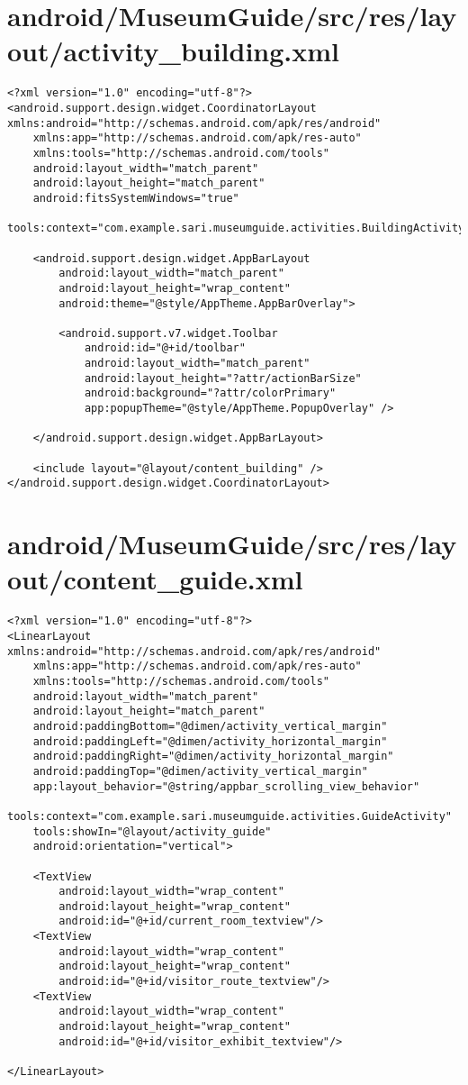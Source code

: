 \section{android/MuseumGuide/src/res/layout/activity\_building.xml}
\begin{lstlisting}<?xml version="1.0" encoding="utf-8"?>
<android.support.design.widget.CoordinatorLayout xmlns:android="http://schemas.android.com/apk/res/android"
    xmlns:app="http://schemas.android.com/apk/res-auto"
    xmlns:tools="http://schemas.android.com/tools"
    android:layout_width="match_parent"
    android:layout_height="match_parent"
    android:fitsSystemWindows="true"
    tools:context="com.example.sari.museumguide.activities.BuildingActivity">

    <android.support.design.widget.AppBarLayout
        android:layout_width="match_parent"
        android:layout_height="wrap_content"
        android:theme="@style/AppTheme.AppBarOverlay">

        <android.support.v7.widget.Toolbar
            android:id="@+id/toolbar"
            android:layout_width="match_parent"
            android:layout_height="?attr/actionBarSize"
            android:background="?attr/colorPrimary"
            app:popupTheme="@style/AppTheme.PopupOverlay" />

    </android.support.design.widget.AppBarLayout>

    <include layout="@layout/content_building" />
</android.support.design.widget.CoordinatorLayout>
\end{lstlisting}
\newpage
\section{android/MuseumGuide/src/res/layout/content\_guide.xml}
\begin{lstlisting}<?xml version="1.0" encoding="utf-8"?>
<LinearLayout xmlns:android="http://schemas.android.com/apk/res/android"
    xmlns:app="http://schemas.android.com/apk/res-auto"
    xmlns:tools="http://schemas.android.com/tools"
    android:layout_width="match_parent"
    android:layout_height="match_parent"
    android:paddingBottom="@dimen/activity_vertical_margin"
    android:paddingLeft="@dimen/activity_horizontal_margin"
    android:paddingRight="@dimen/activity_horizontal_margin"
    android:paddingTop="@dimen/activity_vertical_margin"
    app:layout_behavior="@string/appbar_scrolling_view_behavior"
    tools:context="com.example.sari.museumguide.activities.GuideActivity"
    tools:showIn="@layout/activity_guide"
    android:orientation="vertical">

    <TextView
        android:layout_width="wrap_content"
        android:layout_height="wrap_content"
        android:id="@+id/current_room_textview"/>
    <TextView
        android:layout_width="wrap_content"
        android:layout_height="wrap_content"
        android:id="@+id/visitor_route_textview"/>
    <TextView
        android:layout_width="wrap_content"
        android:layout_height="wrap_content"
        android:id="@+id/visitor_exhibit_textview"/>

</LinearLayout>
\end{lstlisting}
\newpage
